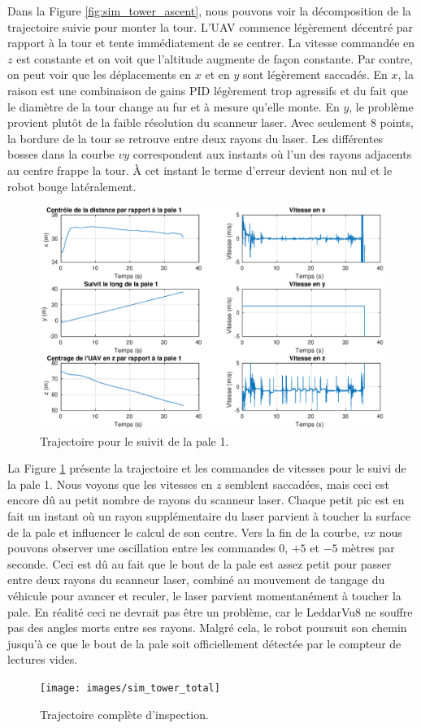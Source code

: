 Dans la Figure \ref{fig:sim_tower_ascent}, nous pouvons voir la décomposition de la trajectoire suivie pour monter la tour. L'UAV commence légèrement décentré par rapport à la tour et tente immédiatement de se centrer. La vitesse commandée en $z$ est constante et on voit que l'altitude augmente de façon constante. Par contre, on peut voir que les déplacements en $x$ et en $y$ sont légèrement saccadés. En $x$, la raison est une combinaison de gains PID légèrement trop agressifs et du fait que le diamètre de la tour change au fur et à mesure qu'elle monte. En $y$, le problème provient plutôt de la faible résolution du scanneur laser. Avec seulement $8$ points, la bordure de la tour se retrouve entre deux rayons du laser. Les différentes bosses dans la courbe $vy$ correspondent aux instants où l'un des rayons adjacents au centre frappe la tour. À cet instant le terme d'erreur devient non nul et le robot bouge latéralement.
\begin{figure}[htb]
  \centering
  \includegraphics[trim=30 20 30 0, clip, width=\linewidth]{images/sim_suivit_pale}
  \caption{Trajectoire pour le suivit de la pale 1.}
  \label{fig:sim_suivit_pale}
\end{figure}

La Figure \ref{fig:sim_suivit_pale} présente la trajectoire et les commandes de vitesses pour le suivi de la pale 1. Nous voyons que les vitesses en $z$ semblent saccadées, mais ceci est encore dû au petit nombre de rayons du scanneur laser. Chaque petit pic est en fait un instant où un rayon supplémentaire du laser parvient à toucher la surface de la pale et influencer le calcul de son centre. Vers la fin de la courbe, $vx$ nous pouvons observer une oscillation entre les commandes $0$, $+5$ et $-5$ mètres par seconde. Ceci est dû au fait que le bout de la pale est assez petit pour passer entre deux rayons du scanneur laser, combiné au mouvement de tangage du véhicule pour avancer et reculer, le laser parvient momentanément à toucher la pale. En réalité ceci ne devrait pas être un problème, car le LeddarVu8 ne souffre pas des angles morts entre ses rayons. Malgré cela, le robot poursuit son chemin jusqu'à ce que le bout de la pale soit officiellement détectée par le compteur de lectures vides.
\begin{figure}[htb]
  \centering
  \texttt{[image: images/sim\_tower\_total]}
  \caption{Trajectoire complète d'inspection.}
  \label{fig:sim_tower_total}
\end{figure}

